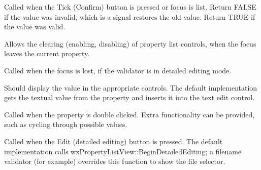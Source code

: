Called when the Tick (Confirm) button is pressed or focus is list. Return FALSE if the value
was invalid, which is a signal restores the old value. Return TRUE if the value was valid.


 
Allows the clearing (enabling, disabling) of property list controls, when the focus leaves the current property.


 
Called when the focus is lost, if the validator is in detailed editing mode.



Should display the value in the appropriate controls. The default implementation gets the
textual value from the property and inserts it into the text edit control.
 


Called when the property is double clicked. Extra functionality can be provided,
such as cycling through possible values.


 
Called when the Edit (detailed editing) button is pressed. The default implementation
calls wxPropertyListView::BeginDetailedEditing; a filename validator (for example) overrides
this function to show the file selector.



